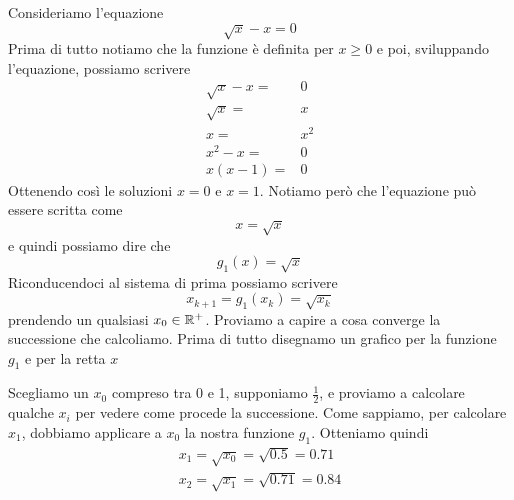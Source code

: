\begin{example}
	Consideriamo l'equazione
	\[ \sqrt{x} - x = 0 \]
	Prima di tutto notiamo che la funzione è definita per $x \geq 0$ e poi, sviluppando l'equazione, possiamo
	scrivere
	\begin{align*}
		\sqrt{x} - x = & 0   \\
		\sqrt{x} =     & x   \\
		x =            & x^2 \\
		x^2 - x =      & 0   \\
		x (x - 1) =    & 0
	\end{align*}
	Ottenendo così le soluzioni $x = 0$ e $x = 1$. Notiamo però che l'equazione può essere scritta come
	\[ x = \sqrt{x} \]
	e quindi possiamo dire che
	\[ g_1(x) = \sqrt{x} \]
	Riconducendoci al sistema di prima possiamo scrivere
	\[ x_{k+1} = g_1(x_k) = \sqrt{x_k} \]
	prendendo un qualsiasi $x_0 \in \mathbb{R}^+$. Proviamo a capire a cosa converge la successione che calcoliamo.
	Prima di tutto disegnamo un grafico per la funzione $g_1$ e per la retta $x$
	\begin{center}
	\end{center}
	Scegliamo un $x_0$ compreso tra 0 e 1, supponiamo $\frac{1}{2}$, e proviamo a calcolare qualche $x_i$ per
	vedere come procede la successione. Come sappiamo, per calcolare $x_1$, dobbiamo applicare a $x_0$ la nostra
	funzione $g_1$. Otteniamo quindi
	\begin{gather*}
		x_1 = \sqrt{x_0} = \sqrt{0.5} = 0.71 \\
		x_2 = \sqrt{x_1} = \sqrt{0.71} = 0.84
	\end{gather*}


\end{example}
